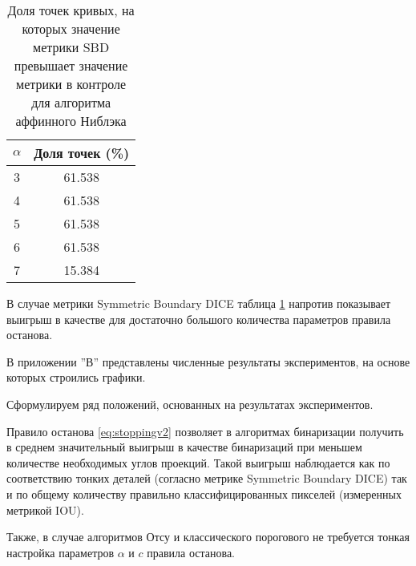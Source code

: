 \begin{table}[H]
\centering
\caption{Доля точек кривых, на которых значение метрики SBD превышает значение метрики в  контроле для алгоритма аффинного Ниблэка}
\label{tab:niblacksbd}
\begin{tabular}{|c|c|}
\hline
\(\alpha\) & Доля точек (\%) \\
\hline
3 & 61.538 \\
4 & 61.538 \\
5 & 61.538 \\
6 & 61.538 \\
7 & 15.384 \\
\hline
\end{tabular}
\end{table}

В случае метрики Symmetric Boundary DICE таблица \ref*{tab:niblacksbd} напротив показывает выигрыш в качестве для достаточно большого количества параметров правила останова.

В приложении ''В'' представлены численные результаты экспериментов, на основе которых строились графики.

Сформулируем ряд положений, основанных на результатах экспериментов.

Правило останова \ref*{eq:stoppingv2} позволяет в алгоритмах бинаризации получить в среднем значительный выигрыш в качестве бинаризаций при меньшем количестве необходимых углов проекций. Такой выигрыш наблюдается как по соответствию тонких деталей (согласно метрике Symmetric Boundary DICE) так и по общему количеству правильно классифицированных пикселей (измеренных метрикой IOU).

Также, в случае алгоритмов Отсу и классического порогового не требуется тонкая настройка параметров \(\alpha\) и \(c\) правила останова.